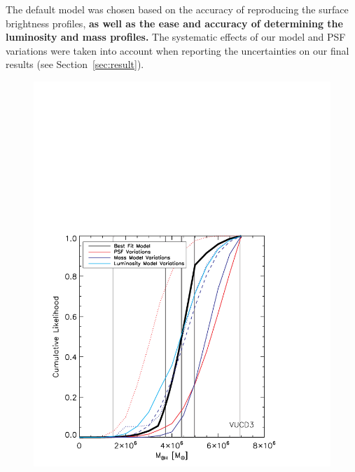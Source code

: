 \documentclass{aastex}
\begin{document}
The default model was chosen based on the accuracy of reproducing the surface brightness profiles, \textbf{as well as the ease and accuracy of determining the luminosity and mass profiles.} The systematic effects of our model and PSF variations were taken into account when reporting the uncertainties on our final results (see Section~\ref{sec:result}). 


\begin{figure}[ht!]
  \centering
  \begin{minipage}{0.48\textwidth}
    \includegraphics[trim={0 0 0 10cm},clip,scale=0.5]{vucd3_cummulike.pdf}%
  \end{minipage}
  \begin{minipage}{0.48\textwidth}

\end{minipage}
\end{figure}
\end{document}

